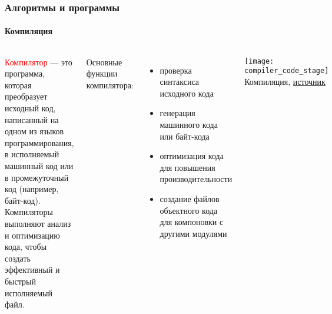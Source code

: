 \documentclass[aspectratio=169]{beamer}
\begin{document}
\begin{frame}
\frametitle{Алгоритмы и программы}
\framesubtitle{Компиляция}
\begin{block}{}
\begin{columns}[]
\column{\dimexpr\linewidth-40mm}
\justifying
\small
\textcolor{red}{Компилятор} — это программа, которая преобразует исходный код, написанный на одном из языков программирования, в исполняемый машинный код или в промежуточный код (например, байт-код).\newline\newline
Компиляторы выполняют анализ и оптимизацию кода, чтобы создать эффективный и быстрый исполняемый файл.\newline

Основные функции компилятора:
\begin{itemize}
\item{проверка синтаксиса исходного кода}
\item{генерация машинного кода или байт-кода}
\item{оптимизация кода для повышения производительности}
\item{создание файлов объектного кода для компоновки с другими модулями}
\end{itemize}

\column{40mm}

\texttt{[image: compiler\_code\_stage]}
\centering
\tiny Компиляция, \href{https://ya.ru}{источник} 

\end{columns}
\end{block}
\end{frame}
\end{document}
